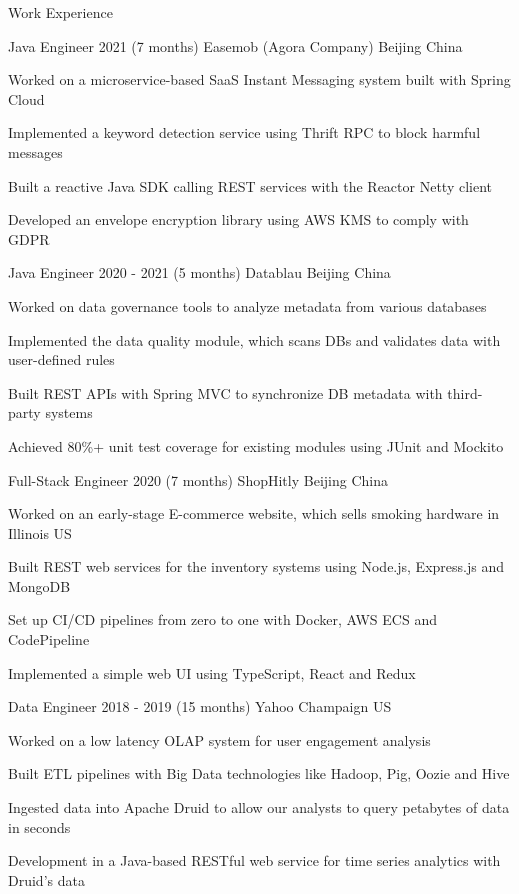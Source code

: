 \documentclass{resume} %
\begin{document}
\begin{rSection}{Work Experience}

\begin{rSubsection}
{Java Engineer} {2021 (7 months)} {Easemob (Agora Company)} {Beijing China}
\item Worked on a microservice-based SaaS Instant Messaging system built with Spring Cloud
\item Implemented a keyword detection service using Thrift RPC to block harmful messages
\item Built a reactive Java SDK calling REST services with the Reactor Netty client
\item Developed an envelope encryption library using AWS KMS to comply with GDPR
\end{rSubsection}

\begin{rSubsection}
{Java Engineer} {2020 - 2021 (5 months)} {Datablau} {Beijing China}
\item Worked on data governance tools to analyze metadata from various databases
\item Implemented the data quality module, which scans DBs and validates data with user-defined rules
\item Built REST APIs with Spring MVC to synchronize DB metadata with third-party systems
\item Achieved 80\%+ unit test coverage for existing modules using JUnit and Mockito
\end{rSubsection}

\begin{rSubsection}
{Full-Stack Engineer} {2020 (7 months)} {ShopHitly} {Beijing China}
\item Worked on an early-stage E-commerce website, which sells smoking hardware in Illinois US
\item Built REST web services for the inventory systems using Node.js, Express.js and MongoDB
\item Set up CI/CD pipelines from zero to one with Docker, AWS ECS and CodePipeline
\item Implemented a simple web UI using TypeScript, React and Redux
\end{rSubsection}

\begin{rSubsection}
{Data Engineer} {2018 - 2019 (15 months)} {Yahoo} {Champaign US}
\item Worked on a low latency OLAP system for user engagement analysis
\item Built ETL pipelines with Big Data technologies like Hadoop, Pig, Oozie and Hive
\item Ingested data into Apache Druid to allow our analysts to query petabytes of data in seconds
\item Development in a Java-based RESTful web service for time series analytics with Druid's data
\end{rSubsection}

\end{rSection}
\end{document}
